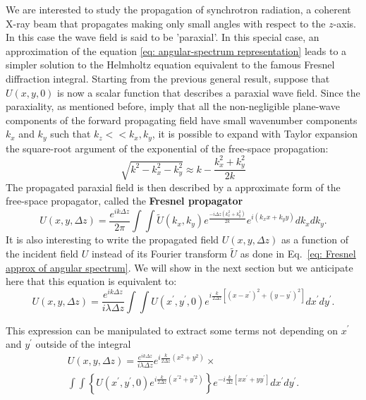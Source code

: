 \documentclass{iucr}              %
\begin{document}
We are interested to study the propagation of synchrotron radiation, a coherent X-ray beam that propagates making only small angles with respect to the $z$-axis. In this case the wave field is said to be 'paraxial'. In this special case, an approximation of the equation \ref{eq: angular-spectrum representation} leads to a simpler solution to the Helmholtz equation equivalent to the famous Fresnel diffraction integral. Starting from the previous general result, suppose that $U(x,y,0)$ is now a scalar function that describes a paraxial wave field. Since the paraxiality, as mentioned before, imply that all the non-negligible plane-wave components of the forward propagating field have small wavenumber components $k_x$ and $k_y$ such that $k_z << k_x, k_y$, it is possible to expand with Taylor expansion the square-root argument of the exponential of the free-space propagation:
\begin{equation}\label{eq: binomial approx}
\sqrt{k^2 -k_x^2-k_y^2}\approx k -\frac{k_x^2+k_y^2}{2k}	
\end{equation}
The propagated paraxial field is then described by a approximate form of the free-space propagator, called the \textbf{Fresnel propagator}
\begin{equation}\label{eq: Fresnel approx of angular spectrum}
U(x, y, \Delta z) = \frac {e^{i k \Delta z}}{ 2 \pi}\int \int \widetilde{U}(k_x, k_y)  e^{\frac{-i \Delta z (k_x^2 + k_y^2) }{2k}} e^{i(k_x x + k_y y)}dk_x dk_y.
\end{equation}
It is also interesting to write the propagated field $U(x,y,\Delta z)$ as a function of the incident field $U$ instead of its Fourier transform $\widetilde{U}$ as done in Eq.~\ref{eq: Fresnel approx of angular spectrum}. We will show in the next section but we anticipate here that this equation is equivalent to: 
\begin{equation}\label{eq: usualfresnel}
\boxed{
U(x,y, \Delta z) = \frac {e^{i k\Delta z }}{ i \lambda \Delta z} \int  \int U(x^\prime, y^\prime, 0) e^{i \frac{k}{2 \Delta z} [(x - x^\prime)^2 + (y - y^\prime)^2]} dx^\prime dy^\prime
}.
\end{equation}

This expression can be manipulated to extract some terms not depending on $x^\prime$ and $y^\prime$ outside of the integral
\begin{multline}\label{eq: fresnel2}
U(x,y, \Delta z) = \frac {e^{i k\Delta z }}{ i \lambda \Delta z}  e^{ i \frac{k}{2 \Delta z} (x^2 + y^2) } \times \\
\int \int \left\{ U(x^\prime, y^\prime, 0) e^{i \frac{k}{2 \Delta z} (x^{\prime 2} + y^{\prime 2} )} \right\} e^{-i \frac{k}{\Delta z} [x  x^\prime + y y^\prime]} dx^\prime dy^\prime .
\end{multline}
\end{document}
